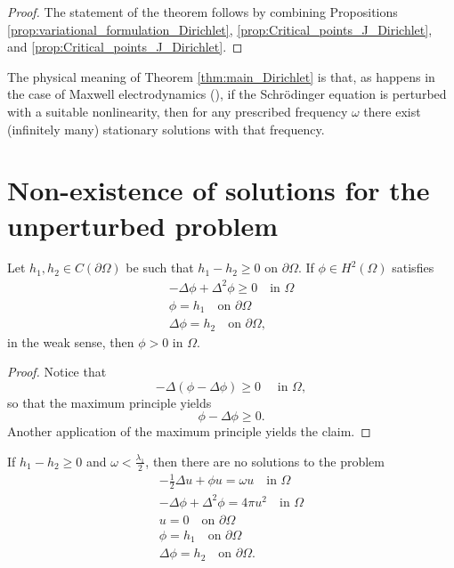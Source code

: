 \documentclass[reqno]{amsart}
\begin{document}
\begin{proof}
The statement of the theorem follows by combining Propositions 
\ref{prop:variational_formulation_Dirichlet}, 
\ref{prop:Critical_points_J_Dirichlet}, and \ref{prop:Critical_points_J_Dirichlet}.
\end{proof}

\begin{remark} \rm
 The physical meaning of Theorem \ref{thm:main_Dirichlet} is that, as happens 
in the case of Maxwell electrodynamics (\cite{PisaniSiciliano2007b}), 
if the Schr\"odinger equation is perturbed with a suitable nonlinearity, then for 
any prescribed frequency $\omega$ there exist (infinitely many) stationary solutions 
with that frequency.
\end{remark}


\section{Non-existence of solutions for the unperturbed problem}
\label{sec:nonexistence}

\begin{lemma}
 \label{lem:max_principle_Dirichlet}
Let $h_1, h_2 \in C(\partial\Omega)$ be such that $h_1 - h_2 \geq 0$ on $\partial\Omega$.
If $\phi \in H^2(\Omega)$ satisfies
 \begin{gather*}
 - \Delta \phi + \Delta^2 \phi  \geq  0  \quad \text{in } \Omega \\
 \phi  =  h_1  \quad \text{on } \partial\Omega \\
 \Delta \phi  =  h_2  \quad \text{on } \partial\Omega,
 \end{gather*}
in the weak sense, then $\phi > 0$ in $\Omega$.
\end{lemma}

\begin{proof}
Notice that 
\[
 - \Delta (\phi - \Delta \phi) \geq 0 \quad \text{ in } \Omega,
\]
so that the maximum principle yields
\[
 \phi - \Delta \phi \geq 0.
\]
Another application of the maximum principle yields the claim.
\end{proof}

\begin{proposition}
If $h_1 - h_2 \geq 0$ and $\omega < \frac{\lambda_1}{2}$, then there are no 
solutions to the problem
 \begin{gather*}
 - \frac{1}{2} \Delta u + \phi u  =  \omega u  \quad \text{in } \Omega \\
 - \Delta \phi + \Delta^2 \phi  =  4 \pi u^2  \quad \text{in } \Omega \\
 u  =  0  \quad \text{on } \partial\Omega \\
 \phi  =  h_1  \quad \text{on } \partial\Omega \\
 \Delta \phi  =  h_2  \quad \text{on } \partial\Omega .
 \end{gather*}
\end{proposition}
\end{document}
